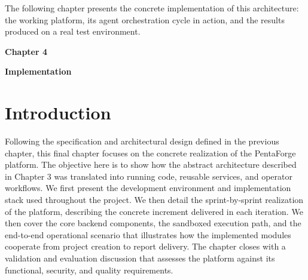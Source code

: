 \documentclass[12pt,a4paper]{report}
\begin{document}
The following chapter presents the concrete implementation of this architecture: the working platform, its agent orchestration cycle in action, and the results produced on a real test environment.

\pagestyle{fancy}
\newpage
\pagestyle{chapterfour}

\vspace*{4cm}

{\fontsize{26}{30}\selectfont \textbf{Chapter 4}}\par

\vspace{1cm}

{\LARGE\bfseries Implementation}

\vspace{0.8cm}
\setcounter{chapter}{4}
\setcounter{section}{0}
\setcounter{table}{0}
\setcounter{figure}{0}


\section{Introduction}

Following the specification and architectural design defined in the previous chapter,
this final chapter focuses on the concrete realization of the PentaForge platform.
The objective here is to show how the abstract architecture described in Chapter 3
was translated into running code, reusable services, and operator workflows. We
first present the development environment and implementation stack used throughout
the project. We then detail the sprint-by-sprint realization of the platform,
describing the concrete increment delivered in each iteration. We then cover the
core backend components, the sandboxed execution path, and the end-to-end
operational scenario that illustrates how the implemented modules cooperate from
project creation to report delivery. The chapter closes with a validation and
evaluation discussion that assesses the platform against its functional,
security, and quality requirements.

\end{document}
